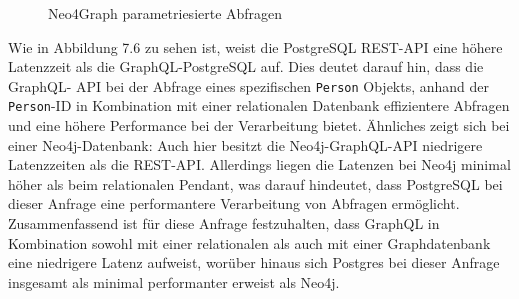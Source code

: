 \begin{figure}[H]
\centering
{}
\caption{Neo4Graph parametriesierte Abfragen}
\end{figure}
\newpage
\noindent
Wie in Abbildung 7.6 zu sehen ist, weist die PostgreSQL REST-API eine höhere Latenzzeit als die GraphQL-PostgreSQL auf. Dies deutet darauf hin, dass die GraphQL- API bei der Abfrage eines spezifischen \texttt{Person} Objekts, anhand der \texttt{Person}-ID in Kombination mit einer relationalen Datenbank effizientere Abfragen und eine höhere Performance bei der Verarbeitung bietet. Ähnliches zeigt sich bei einer Neo4j-Datenbank: Auch hier besitzt die Neo4j-GraphQL-API niedrigere Latenzzeiten als die REST-API. Allerdings liegen die Latenzen bei Neo4j minimal höher als beim relationalen Pendant, was darauf hindeutet, dass PostgreSQL bei dieser Anfrage eine performantere Verarbeitung von Abfragen ermöglicht. Zusammenfassend ist für diese Anfrage festzuhalten, dass GraphQL in Kombination sowohl mit einer relationalen als auch mit einer Graphdatenbank eine niedrigere Latenz aufweist, worüber hinaus sich Postgres bei dieser Anfrage insgesamt als minimal performanter erweist als Neo4j.
